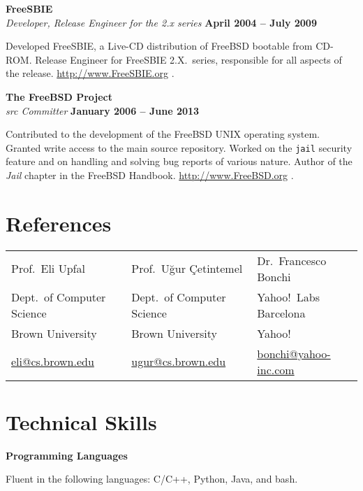 \documentclass[margin,line]{resume}
\begin{document}
{\bf FreeSBIE }\\
{\em Developer, Release Engineer for the 2.x series} \hfill{\bf April 2004 --
July 2009}

\begin{list2}
\vspace*{.05in}
\item Developed FreeSBIE, a Live-CD distribution of FreeBSD bootable from CD-ROM.
Release Engineer for FreeSBIE 2.X.~series, responsible for all aspects of
the release. \url{http://www.FreeSBIE.org} .
\end{list2}

{\bf The FreeBSD Project}\\
{\em \textrm{src} Committer} \hfill {\bf January 2006 -- June 2013}

\begin{list2}
\vspace*{.05in}
\item Contributed to the development of the FreeBSD UNIX operating system.
  Granted write access to the main source repository. Worked on the
  \texttt{jail} security feature and on handling and solving bug reports of
  various nature. Author of the \emph{Jail} chapter in the FreeBSD Handbook.
  \url{http://www.FreeBSD.org} .
\end{list2}

\section {\sc References}
\begin{table}[h!]
  \centering
  \begin{tabular}{lll}
    Prof.~Eli Upfal & Prof.~U\u{g}ur \c{C}etintemel & Dr.~Francesco Bonchi \\
    Dept.~of Computer Science & Dept.~of Computer Science & Yahoo!~Labs Barcelona
    \\
    Brown University & Brown University & Yahoo! \\
    \url{eli@cs.brown.edu} & \url{ugur@cs.brown.edu} &
    \url{bonchi@yahoo-inc.com} \\
  \end{tabular}
\end{table}

\iffalse
\section {\sc Technical Skills}
{\bf Programming Languages}
\begin{list2}
\vspace*{.05in}
\item Fluent in the following languages: C/C++, Python, Java, and bash.
\end{list2}
\end{document}
